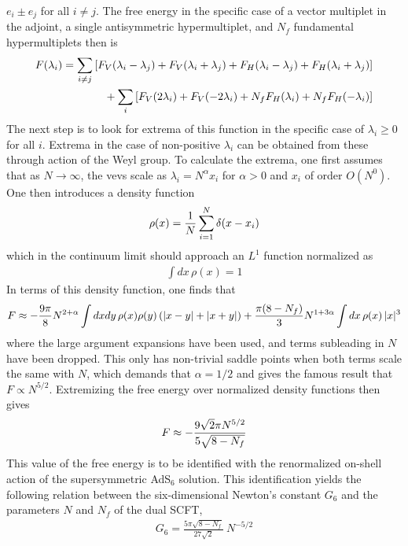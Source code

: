 \documentclass[12pt]{article}
\begin{document}
 $e_i \pm e_j$ for all $i \neq j$. The free energy in the specific case of a vector multiplet in the adjoint, a single antisymmetric hypermultiplet, and $N_f$ fundamental hypermultiplets then is
\begin{eqnarray}
F(\lambda_i) = \sum_{i \neq j} \left[F_V(\lambda_i - \lambda_j) + F_V(\lambda_i + \lambda_j) + F_H(\lambda_i - \lambda_j) + F_H(\lambda_i + \lambda_j) \right] 
\nonumber\\
\vphantom{.}\hspace{0.3in}+ \sum_i \left[F_V(2 \lambda_i) + F_V(-2 \lambda_i) + N_f F_H(\lambda_i) + N_f F_H(-\lambda_i) \right]
\end{eqnarray}
The next step is to look for extrema of this function in the specific case of $\lambda_i \geq 0$ for all $i$. Extrema in the case of non-positive $\lambda_i$ can be obtained from these through action of the Weyl group.
To calculate the extrema, one first assumes that as $N \rightarrow \infty$, the vevs scale as $\lambda_i = N^\alpha x_i$ for $\alpha>0$ and $x_i$ of order $O(N^0)$. One then introduces a density function
\begin{eqnarray}
\rho(x) = {1 \over N} \sum_{i=1}^N \delta(x-x_i) 
\end{eqnarray}
which in the continuum limit should approach an $L^1$ function normalized as 
\begin{eqnarray}
\int dx\, \rho(x) = 1
\end{eqnarray}
In terms of this density function, one finds that 
\begin{eqnarray}
F \approx -{9 \pi \over 8} N^{2 + \alpha} \int dx dy \,\rho(x) \rho(y) \left(|x-y| + |x+y| \right) + {\pi (8-N_f) \over 3} N^{1 + 3 \alpha} \int dx\, \rho(x)\, |x|^3
\end{eqnarray}
where the large argument expansions  have been used, and terms subleading in $N$ have been dropped. This only has non-trivial saddle points when both terms scale the same with $N$, which demands that $\alpha=1/2$ and gives the famous result that $F\propto N^{5/2}$. Extremizing the free energy over normalized density functions then gives 
\begin{eqnarray}
F \approx - {9 \sqrt{2} \pi N^{5/2} \over 5 \sqrt{8-N_f}}
\end{eqnarray}
This value of the free energy is to be identified with the renormalized on-shell action of the supersymmetric AdS$_6$ solution. This identification yields the following relation between the six-dimensional Newton's constant $G_6$ and the parameters $N$ and $N_f$ of the dual SCFT,
\begin{eqnarray}
G_6= \frac{5\pi\sqrt{8-N_f}}{27\sqrt{2}} ~N^{-5/2}
\end{eqnarray}
\end{document}
